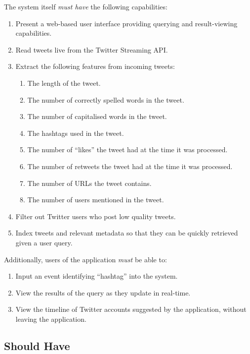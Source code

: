 \documentclass{l4proj}
\begin{document}
    The system itself \textit{must have} the following capabilities:
    \begin{enumerate}
    \item Present a web-based user interface providing querying and result-viewing capabilities.
    \item Read tweets live from the Twitter Streaming API.
    \item Extract the following features from incoming tweets:
        \begin{enumerate}
        \item The length of the tweet.
        \item The number of correctly spelled words in the tweet.
        \item The number of capitalised words in the tweet.
        \item The hashtags used in the tweet.
        \item The number of ``likes'' the tweet had at the time it was processed. 
        \item The number of retweets the tweet had at the time it was processed.
        \item The number of URLs the tweet contains.
        \item The number of users mentioned in the tweet.
        \end{enumerate} 
    \item Filter out Twitter users who post low quality tweets.
   \item Index tweets and relevant metadata so that they can be quickly retrieved given a user query.
    \end{enumerate}

    Additionally, users of the application \textit{must} be able to:
    \begin{enumerate}
    \item Input an event identifying ``hashtag'' into the system.
    \item View the results of the query as they update in real-time.
    \item View the timeline of Twitter accounts suggested by the application, without leaving the application.   
    \end{enumerate}
    
        \subsection{Should Have}
        
\end{document}
